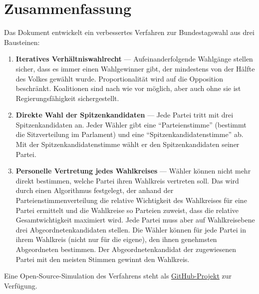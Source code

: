 \section*{Zusammenfassung}

Das Dokument entwickelt ein verbessertes Verfahren zur Bundestagswahl aus drei Bausteinen:

\begin{enumerate}
  \item \textbf{Iteratives Verhältniswahlrecht} --- Aufeinanderfolgende Wahlgänge stellen sicher,
    dass es immer einen Wahlgewinner gibt, der mindestens von der Hälfte des Volkes gewählt wurde.
    Proportionalität wird auf die Opposition beschränkt. Koalitionen sind nach wie vor möglich,
    aber auch ohne sie ist Regierungsfähigkeit sichergestellt.

  \item \textbf{Direkte Wahl der Spitzenkandidaten} --- Jede Partei tritt mit drei
    Spitzenkandidaten an. Jeder Wähler gibt eine \enquote{Parteienstimme} (bestimmt die
    Sitzverteilung im Parlament) und eine \enquote{Spitzenkandidatenstimme} ab. Mit der
    Spitzenkandidatenstimme wählt er den Spitzenkandidaten seiner Partei.

  \item \textbf{Personelle Vertretung jedes Wahlkreises} --- Wähler können nicht mehr direkt
    bestimmen, welche Partei ihren Wahlkreis vertreten soll. Das wird durch einen Algorithmus
    festgelegt, der anhand der Parteienstimmenverteilung die relative Wichtigkeit des Wahlkreises
    für eine Partei ermittelt und die Wahlkreise so Parteien zuweist, dass die relative
    Gesamtwichtigkeit maximiert wird.
    Jede Partei muss aber auf Wahlkreisebene drei Abgeordnetenkandidaten stellen. Die Wähler
    können für jede Partei in ihrem Wahlkreis (nicht nur für die eigene), den ihnen genehm\-sten
    Abgeordneten bestimmen. Der Abgeordnetenkandidat der zugewiesenen Partei mit den meisten
    Stimmen gewinnt den Wahlkreis.
\end{enumerate}

Eine Open-Source-Simulation des Verfahrens steht als
\href{https://github.com/danielschwalbe/ipres}{GitHub-Projekt} zur Verfügung.
